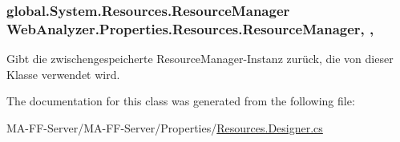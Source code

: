 \hypertarget{class_web_analyzer_1_1_properties_1_1_resources_a952c3262175975dd9ed444245795013e}{}
\subsubsection[{Resource\+Manager}]{\setlength{\rightskip}{0pt plus 5cm}global.\+System.\+Resources.\+Resource\+Manager Web\+Analyzer.\+Properties.\+Resources.\+Resource\+Manager\hspace{0.3cm}{\ttfamily [static]}, {\ttfamily [get]}, {\ttfamily [package]}}\label{class_web_analyzer_1_1_properties_1_1_resources_a952c3262175975dd9ed444245795013e}


Gibt die zwischengespeicherte Resource\+Manager-\/\+Instanz zurück, die von dieser Klasse verwendet wird. 



The documentation for this class was generated from the following file\+:\begin{DoxyCompactItemize}
\item 
M\+A-\/\+F\+F-\/\+Server/\+M\+A-\/\+F\+F-\/\+Server/\+Properties/\hyperlink{_resources_8_designer_8cs}{Resources.\+Designer.\+cs}\end{DoxyCompactItemize}
